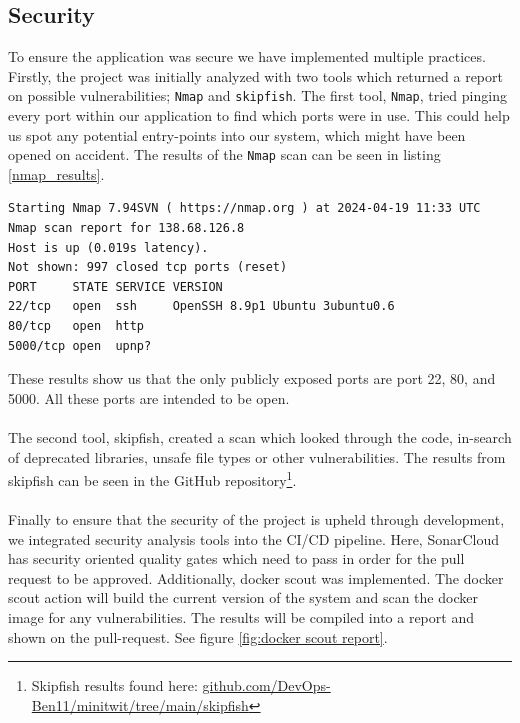 \subsection{Security}
To ensure the application was secure we have implemented multiple practices. 
Firstly, the project was initially analyzed with two tools which returned a report on possible vulnerabilities; \texttt{Nmap} and \texttt{skipfish}. The first tool, \texttt{Nmap}, tried pinging every port within our application to find which ports were in use. This could help us spot any potential entry-points into our system, which might have been opened on accident. The results of the \texttt{Nmap} scan can be seen in listing \ref{nmap_results}.
\begin{lstlisting}[frame = trBL, label=nmap_results, caption={Listing of the report returned by Nmap}]
Starting Nmap 7.94SVN ( https://nmap.org ) at 2024-04-19 11:33 UTC
Nmap scan report for 138.68.126.8
Host is up (0.019s latency).
Not shown: 997 closed tcp ports (reset)
PORT     STATE SERVICE VERSION
22/tcp   open  ssh     OpenSSH 8.9p1 Ubuntu 3ubuntu0.6 
80/tcp   open  http
5000/tcp open  upnp?
\end{lstlisting}
These results show us that the only publicly exposed ports are port 22, 80, and 5000. All these ports are intended to be open. 
\\
\\
The second tool, skipfish, created a scan which looked through the code, in-search of deprecated libraries, unsafe file types or other vulnerabilities. The results from skipfish can be seen in the GitHub repository\footnote{Skipfish results found here: 
\href{https://github.com/DevOps-Ben11/minitwit/tree/main/skipfish/}{github.com/DevOps-Ben11/minitwit/tree/main/skipfish}}.
\\
\\
Finally to ensure that the security of the project is upheld through development, we integrated security analysis tools into the CI/CD pipeline. Here, SonarCloud has security oriented quality gates which need to pass in order for the pull request to be approved. Additionally, docker scout was implemented. The docker scout action will build the current version of the system and scan the docker image for any vulnerabilities. The results will be compiled into a report and shown on the pull-request. See figure \ref{fig:docker scout report}.
